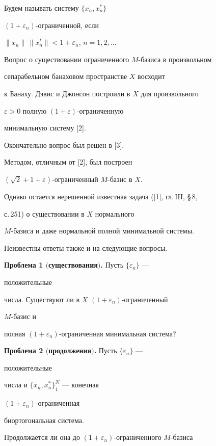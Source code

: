 Будем называть систему $\{x_n,x^*_n\}$\; 


$(1+\varepsilon_n)$-ограниченной, если 


$\|x_n\|\,\|x^*_n\|<1+\varepsilon_n$, $n=1,2,\dotsc$ 


 


Вопрос о существовании ограниченного $M$-базиса в произвольном 


сепарабельном банаховом пространстве $X$ восходит 


к Банаху. Дэвис и Джонсон построили в $X$ для произвольного 


$\varepsilon>0$ полную $(1+\varepsilon)$-ограниченную 


минимальную систему [2]. 


Окончательно вопрос был решен в [3]. 


Методом, отличным от [2], был построен 


$(\sqrt{2}+1+\varepsilon)$-ограниченный $M$-базис в $X$. 


Однако остается нерешенной известная задача ([1], гл.\,III, \S\,8, 


с.\,251) о существовании в $X$ нормального 


$M$-базиса и даже нормальной полной минимальной системы. 


Неизвестны ответы также и на следующие вопросы. 


\medskip 


 


{\bf Проблема 1 $($существования$)$.} Пусть $\{\varepsilon_n\}$ --- 


положительные 


числа. Существуют ли в $X$\; $(1+\varepsilon_n)$-ограниченный 


$M$-базис и 


полная $(1+\varepsilon_n)$-ограниченная минимальная система? 


\medskip 


 


{\bf Проблема 2 $($продолжения$)$.} Пусть $\{\varepsilon_n\}$ --- 


положительные 


числа и $\{x_n,x^*_n\}^N_1$ --- конечная 


$(1+\varepsilon_n)$-ограниченная 


биортогональная система. 


Продолжается ли она до $(1+\varepsilon_n)$-ограниченного $M$-базиса 


